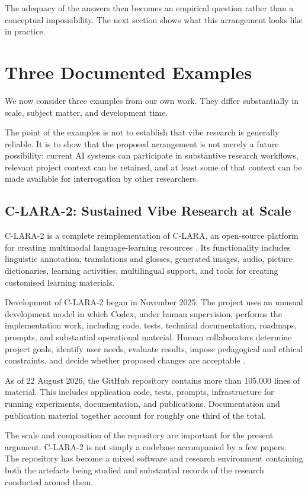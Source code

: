 The adequacy of the answers then becomes an empirical question rather than a conceptual impossibility. The next section shows what this arrangement looks like in practice.


\section{Three Documented Examples}

We now consider three examples from our own work. They differ substantially in scale, subject matter, and development time.

The point of the examples is not to establish that vibe research is generally reliable. It is to show that the proposed arrangement is not merely a future possibility: current AI systems can participate in substantive research workflows, relevant project context can be retained, and at least some of that context can be made available for interrogation by other researchers.


\subsection{C-LARA-2: Sustained Vibe Research at Scale}

C-LARA-2 is a complete reimplementation of C-LARA, an open-source platform for creating multimodal language-learning resources \citep{claraOriginal}. Its functionality includes linguistic annotation, translations and glosses, generated images, audio, picture dictionaries, learning activities, multilingual support, and tools for creating customised learning materials.

Development of C-LARA-2 began in November 2025. The project uses an unusual development model in which Codex, under human supervision, performs the implementation work, including code, tests, technical documentation, roadmaps, prompts, and substantial operational material. Human collaborators determine project goals, identify user needs, evaluate results, impose pedagogical and ethical constraints, and decide whether proposed changes are acceptable \citep[Section~2.4]{bediEtAl2026clara2}.

As of 22 August 2026, the GitHub repository contains more than 105,000 lines of material. This includes application code, tests, prompts, infrastructure for running experiments, documentation, and publications. Documentation and publication material together account for roughly one third of the total.

The scale and composition of the repository are important for the present argument. C-LARA-2 is not simply a codebase accompanied by a few papers. The repository has become a mixed software and research environment containing both the artefacts being studied and substantial records of the research conducted around them.

